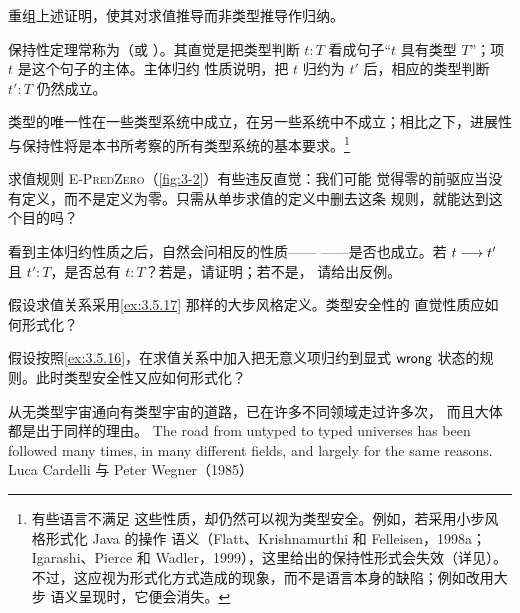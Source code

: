 \begin{exercise}[\(\star\star,\nrightarrow\)]
\label{ex:8.3.4}
重组上述证明，使其对求值推导而非类型推导作归纳。
\end{exercise}

保持性定理常称为（或
）。其直觉是把类型判断 \(t:T\)
看成句子“\(t\) 具有类型 \(T\)”；项 \(t\) 是这个句子的主体。主体归约
性质说明，把 \(t\) 归约为 \(t'\) 后，相应的类型判断 \(t':T\) 仍然成立。

类型的唯一性在一些类型系统中成立，在另一些系统中不成立；相比之下，进展性
与保持性将是本书所考察的所有类型系统的基本要求。\footnote{有些语言不满足
这些性质，却仍然可以视为类型安全。例如，若采用小步风格形式化 Java 的操作
语义（Flatt、Krishnamurthi 和 Felleisen，1998a；Igarashi、Pierce 和
Wadler，1999），这里给出的保持性形式会失效（详见）。
不过，这应视为形式化方式造成的现象，而不是语言本身的缺陷；例如改用大步
语义呈现时，它便会消失。}

\begin{exercise}[\(\star\)]
\label{ex:8.3.5}
求值规则 \textsc{E-PredZero}（\cref{fig:3-2}）有些违反直觉：我们可能
觉得零的前驱应当没有定义，而不是定义为零。只需从单步求值的定义中删去这条
规则，就能达到这个目的吗？
\end{exercise}

\begin{exercise}
\label{ex:8.3.6}
看到主体归约性质之后，自然会问相反的性质——
——是否也成立。若
\(t\mathrel{\longrightarrow} t'\) 且 \(t':T\)，是否总有 \(t:T\)？若是，请证明；若不是，
请给出反例。
\end{exercise}

\begin{exercise}
\label{ex:8.3.7}
假设求值关系采用\cref{ex:3.5.17} 那样的大步风格定义。类型安全性的
直觉性质应如何形式化？
\end{exercise}

\begin{exercise}
\label{ex:8.3.8}
假设按照\cref{ex:3.5.16}，在求值关系中加入把无意义项归约到显式
\(\mathsf{wrong}\) 状态的规则。此时类型安全性又应如何形式化？
\end{exercise}

\bilingualepigraph
  {从无类型宇宙通向有类型宇宙的道路，已在许多不同领域走过许多次，
   而且大体都是出于同样的理由。}
  {The road from untyped to typed universes has been followed many times,
   in many different fields, and largely for the same reasons.}
  {Luca Cardelli 与 Peter Wegner（1985）}
